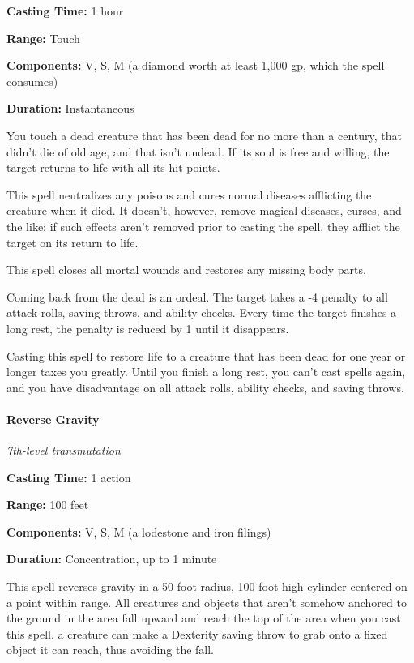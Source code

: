 \documentclass[
]{article}
\begin{document}
\textbf{Casting Time:} 1 hour

\textbf{Range:} Touch

\textbf{Components:} V, S, M (a diamond worth at least 1,000 gp, which
the spell consumes)

\textbf{Duration:} Instantaneous

You touch a dead creature that has been dead for no more than a century,
that didn't die of old age, and that isn't undead. If its soul is free
and willing, the target returns to life with all its hit points.

This spell neutralizes any poisons and cures normal diseases afflicting
the creature when it died. It doesn't, however, remove magical diseases,
curses, and the like; if such effects aren't removed prior to casting
the spell, they afflict the target on its return to life.

This spell closes all mortal wounds and restores any missing body parts.

Coming back from the dead is an ordeal. The target takes a -4 penalty to
all attack rolls, saving throws, and ability checks. Every time the
target finishes a long rest, the penalty is reduced by 1 until it
disappears.

Casting this spell to restore life to a creature that has been dead for
one year or longer taxes you greatly. Until you finish a long rest, you
can't cast spells again, and you have disadvantage on all attack rolls,
ability checks, and saving throws.

\hypertarget{reverse-gravity}{%
\paragraph{Reverse Gravity}\label{reverse-gravity}}

\emph{7th-level transmutation}

\textbf{Casting Time:} 1 action

\textbf{Range:} 100 feet

\textbf{Components:} V, S, M (a lodestone and iron filings)

\textbf{Duration:} Concentration, up to 1 minute

This spell reverses gravity in a 50-foot-radius, 100-foot high cylinder
centered on a point within range. All creatures and objects that aren't
somehow anchored to the ground in the area fall upward and reach the top
of the area when you cast this spell. a creature can make a Dexterity
saving throw to grab onto a fixed object it can reach, thus avoiding the
fall.
\end{document}
